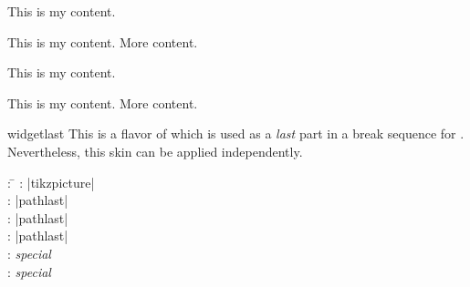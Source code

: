 \begin{dispExample}
\begin{tcbraster}[widget,skin=widgetmiddle,raster equal height,raster columns=4,
    colback=LightGreen,colframe=DarkGreen,
    left=1mm,right=1mm,top=1mm,bottom=1mm,middle=1mm]
  \begin{tcolorbox}
    This is my content.
  \end{tcolorbox}
  \begin{tcolorbox}
    This is my content.
    \tcblower
    More content.
  \end{tcolorbox}
  \begin{tcolorbox}[adjusted title=My title]
    This is my content.
  \end{tcolorbox}
  \begin{tcolorbox}[adjusted title=My title]
    This is my content.
    \tcblower
    More content.
  \end{tcolorbox}
\end{tcbraster}
\end{dispExample}


\clearpage
\begin{docSkin}{widgetlast}
This is a flavor of  which is used as a \emph{last} part
in a break sequence for .
Nevertheless, this skin can be applied independently.
\begin{tcolorbox}[skintable=widgetlast]
  \begin{tabbing}
    : \=\kill
    :  \> |tikzpicture|\\ 
    :           \> |pathlast|\\
    : \> |pathlast|\\ 
    :        \> |pathlast|\\
    :    \> \emph{special}\\
    :           \> \emph{special}
  \end{tabbing}
\end{tcolorbox}
\end{docSkin}


